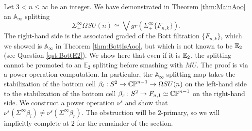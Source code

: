 \begin{comment}
Finally, we show that $\phi$ cannot be compatible with $\nu^u$ on homotopy by directly computing $\nu^u$ on either side.

For $n>3$, observe that the natural map $\Omega SU(n) \to BU$ is an isomorphism in homology up to degree $7$.  This implies that $\pi_5(\Omega SU(n)) \simeq \pi_5(BU) \simeq 0$ because $BU$ is even.  Hence, $\nu^u$ is trivial on the generator of $\pi_2(\Omega SU(n)).$  

Similarly, the map $Q\CP^{n-1} \to Q\CP^\infty$ is an isomorphism on $\pi_5$ for $n>3$.  However, it was computed in \cite[Theorem II.8]{Liulevicius} that $\pi_5(\CP^{\infty})=\mathbb{Z}/2$ generated by $\nu$ times the degree $2$ generator.  Hence, by Remark \ref{rmk:multnu1}, if $\beta\in \pi_2(Q\CP^{n-1})$ denotes the generator, then $\nu^u(\beta)\in \pi_5(Q\CP^{n-1})$ is nontrivial.  This implies that there can be no $\E_2$ map $\phi$ which induces an isomorphism on $\pi_2$ and concludes the proof.  

\begin{rmk}%
Taking the limit as $n\to\infty$, we obtain the statement that the map $BU\to Q\CP^{\infty}$ implementing the splitting principle does not lift to an $\E_2$ map.  This map is well-studied: among other places, it appears as the first connecting map in the Weiss tower for the functor $V\mapsto BU(V)$.  As such, it can be seen as a ``$BU$-analog'' to the Kahn-Priddy map.  
\end{rmk}



\end{comment}

Let $3< n\leq \infty$ be an integer.  We have demonstrated in Theorem \ref{thm:MainAoo} an $\mathbb{A}_\infty$ splitting $$\Sigma^{\infty}_+ \Omega SU(n) \simeq \bigvee gr(\Sigma^{\infty}_+ \{ F_{n,k} \}).$$  The right-hand side is the associated graded of the Bott filtration $\{ F_{n,k} \}$, which we showed is $\mathbb{A}_\infty$ in Theorem \ref{thm:BottIsAoo}, but which is not known to be $\operatorname{\mathbb{E}}_2$ (see Question \ref{qst:BottE2}).  We show here that even if it is $\operatorname{\mathbb{E}}_2$, the splitting cannot be promoted to an $\mathbb{E}_2$ splitting before smashing with $MU$.  The proof is via a power operation computation.  In particular, the $\mathbb{A}_\infty$ splitting map takes the stabilization of the bottom cell $\beta_l : S^2 \to  \operatorname{\mathbb{CP}}^{n-1} \to \Omega SU(n)$ on the left-hand side to the stabilization of the bottom cell $\beta_r: S^2 \to F_{n,1} \simeq \operatorname{\mathbb{CP}}^{n-1}$ on the right-hand side.  We construct a power operation $\nu^{s}$ and show that $\nu^{s}(\Sigma^{\infty} \beta_l) \neq \nu^s(\Sigma^{\infty} \beta_r).$  The obstruction will be $2$-primary, so we will implicitly complete at $2$ for the remainder of the section.  

